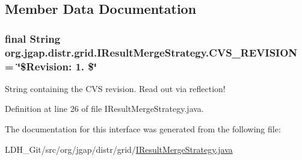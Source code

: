 \subsection{Member Data Documentation}
\hypertarget{interfaceorg_1_1jgap_1_1distr_1_1grid_1_1_i_result_merge_strategy_aaadab088ddc9a214a37362048d772075}{
\subsubsection[{C\-V\-S\-\_\-\-R\-E\-V\-I\-S\-I\-O\-N}]{\setlength{\rightskip}{0pt plus 5cm}final String org.\-jgap.\-distr.\-grid.\-I\-Result\-Merge\-Strategy.\-C\-V\-S\-\_\-\-R\-E\-V\-I\-S\-I\-O\-N = \char`\"{}\$Revision\-: 1. \$\char`\"{}\hspace{0.3cm}{\ttfamily [static]}}}\label{interfaceorg_1_1jgap_1_1distr_1_1grid_1_1_i_result_merge_strategy_aaadab088ddc9a214a37362048d772075}
String containing the C\-V\-S revision. Read out via reflection! 

Definition at line 26 of file I\-Result\-Merge\-Strategy.\-java.



The documentation for this interface was generated from the following file\-:\begin{DoxyCompactItemize}
\item 
L\-D\-H\-\_\-\-Git/src/org/jgap/distr/grid/\hyperlink{_i_result_merge_strategy_8java}{I\-Result\-Merge\-Strategy.\-java}\end{DoxyCompactItemize}
